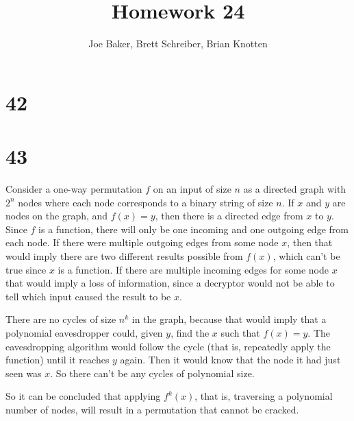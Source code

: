 \documentclass[letterpaper,notitlepage,twoside]{article}
\begin{document}
\title{Homework 24}
\author{Joe Baker, Brett Schreiber, Brian Knotten}
\maketitle
\section*{42}

\section*{43}
Consider a one-way permutation $f$ on an input of size $n$ as a directed graph with $2^n$ nodes where each node corresponds to a binary string of size $n$. If $x$ and $y$ are nodes on the graph, and $f(x) = y$, then there is a directed edge from $x$ to $y$. Since $f$ is a function, there will only be one incoming and one outgoing edge from each node. If there were multiple outgoing edges from some node $x$, then that would imply there are two different results possible from $f(x)$, which can't be true since $x$ is a function. If there are multiple incoming edges for some node $x$ that would imply a loss of information, since a decryptor would not be able to tell which input caused the result to be $x$.

There are no cycles of size $n^k$ in the graph, because that would imply that a polynomial eavesdropper could, given $y$, find the $x$ such that $f(x) = y$. The eavesdropping algorithm would follow the cycle (that is, repeatedly apply the function) until it reaches $y$ again. Then it would know that the node it had just seen was $x$. So there can't be any cycles of polynomial size.

So it can be concluded that applying $f^k(x)$, that is, traversing a polynomial number of nodes, will result in a permutation that cannot be cracked.
\end{document}
